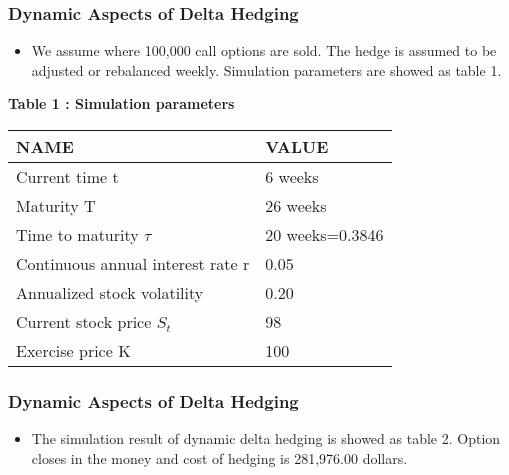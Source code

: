 \documentclass[cjk]{beamer}
\begin{document}
\begin{CJK*}{UTF8}{gbsn}
\begin{frame}
\frametitle{Dynamic Aspects of Delta Hedging}
\begin{itemize}
\item We assume where 100,000 call options are sold. The hedge is assumed to be adjusted or rebalanced weekly. Simulation parameters are showed as table 1.
\end{itemize}


\caption{\bfseries \color{blue} Table 1 : Simulation parameters}
\begin{tabular}{|l|l|}
\toprule
\hline
\textbf{NAME} & \textbf{VALUE} \\
\midrule
\hline
Current time t                    & 6 weeks \\
\hline
Maturity T                        & 26 weeks \\
\hline
Time to maturity $\tau$           & 20 weeks=0.3846 \\
\hline
Continuous annual interest rate r & 0.05 \\
\hline
Annualized stock volatility       & 0.20 \\
\hline
Current stock price $S_{t}$       & 98 \\
\hline
Exercise price K                  & 100 \\
\hline
\bottomrule
\end{tabular}
\end{frame}

\begin{frame}
\frametitle{Dynamic Aspects of Delta Hedging}
\begin{itemize}
\item The simulation result of dynamic delta hedging is showed as table 2. Option closes in the money and cost of hedging is 281,976.00 dollars.
\end{itemize}
\end{frame}


\end{CJK*}
\end{document}
